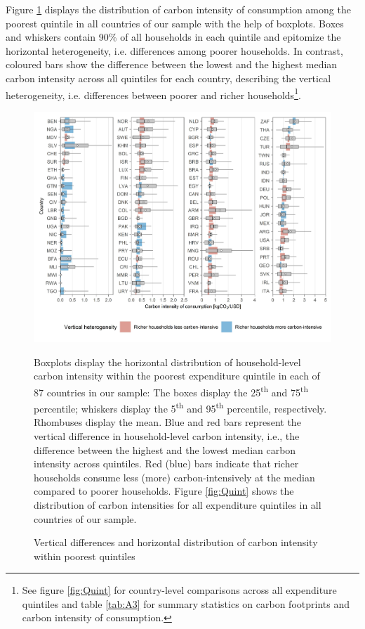 \documentclass[12pt, a4paper]{article}
\newenvironment{subcaption2}
{\strut
\vspace{-5pt}
\begin{minipage}[b]{0.9\textwidth}
  \hspace*{-\parindent}
  \footnotesize}
 {\end{minipage}}
\begin{document}
Figure \ref{fig:fig_1} displays the distribution of carbon intensity of consumption among the poorest quintile in all countries of our sample with the help of boxplots. Boxes and whiskers contain 90\% of all households in each quintile and epitomize the horizontal heterogeneity, i.e. differences among poorer households. In contrast, coloured bars show the difference between the lowest and the highest median carbon intensity across all quintiles for each country, describing the vertical heterogeneity, i.e. differences between poorer and richer households\footnote{See figure \ref{fig:Quint} for country-level comparisons across all expenditure quintiles and table \ref{tab:A3} for summary statistics on carbon footprints and carbon intensity of consumption.}.

\begin{figure}[ht!]
    \centering
    \includegraphics{Figure 1/Figure_1_2017}
    \caption{Vertical differences and horizontal distribution of carbon intensity within poorest quintiles}
    \label{fig:fig_1}
    \begin{subcaption2}
    Boxplots display the horizontal distribution of household-level carbon intensity within the poorest expenditure quintile in each of 87 countries in our sample: The boxes display the 25\textsuperscript{th} and 75\textsuperscript{th} percentile; whiskers display the 5\textsuperscript{th} and 95\textsuperscript{th} percentile, respectively. Rhombuses display the mean. Blue and red bars represent the vertical difference in household-level carbon intensity, i.e., the difference between the highest and the lowest median carbon intensity across quintiles. Red (blue) bars indicate that richer households consume less (more) carbon-intensively at the median compared to poorer households. Figure \ref{fig:Quint} shows the distribution of carbon intensities for all expenditure quintiles in all countries of our sample.
    \end{subcaption2}
\end{figure}
\end{document}
